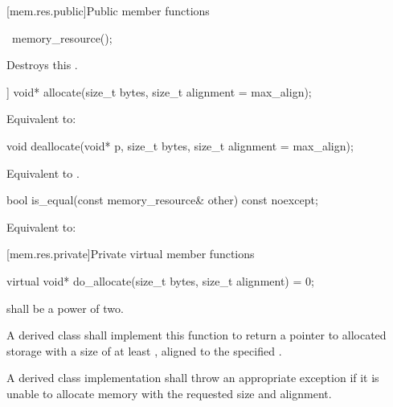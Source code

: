 [mem.res.public]{Public member functions}

%
\begin{itemdecl}
~memory_resource();
\end{itemdecl}

\begin{itemdescr}
\pnum
\effects
Destroys this .
\end{itemdescr}

%
\begin{itemdecl}
[[nodiscard]] void* allocate(size_t bytes, size_t alignment = max_align);
\end{itemdecl}

\begin{itemdescr}
\pnum
\effects
Equivalent to: 
\end{itemdescr}

%
\begin{itemdecl}
void deallocate(void* p, size_t bytes, size_t alignment = max_align);
\end{itemdecl}

\begin{itemdescr}
\pnum
\effects
Equivalent to .
\end{itemdescr}

%
\begin{itemdecl}
bool is_equal(const memory_resource& other) const noexcept;
\end{itemdecl}

\begin{itemdescr}
\pnum
\effects
Equivalent to: 
\end{itemdescr}


[mem.res.private]{Private virtual member functions}

%
\begin{itemdecl}
virtual void* do_allocate(size_t bytes, size_t alignment) = 0;
\end{itemdecl}

\begin{itemdescr}
\pnum
\requires
{} shall be a power of two.

\pnum
\returns
A derived class shall implement this function to
return a pointer to allocated storage
with a size of at least ,
aligned to the specified .

\pnum
\throws
A derived class implementation shall throw an appropriate exception if it is unable to allocate memory with the requested size and alignment.
\end{itemdescr}

